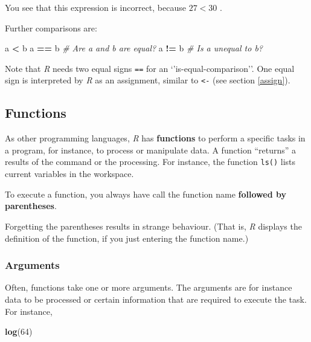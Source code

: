 \documentclass[
]{scrartcl}
\makeatletter
\newenvironment{Shaded}{\begin{snugshade}}{\end{snugshade}}
\newcommand{\CommentTok}[1]{\textcolor[rgb]{0.56,0.35,0.01}{\textit{#1}}}
\newcommand{\DecValTok}[1]{\textcolor[rgb]{0.00,0.00,0.81}{#1}}
\newcommand{\KeywordTok}[1]{\textcolor[rgb]{0.13,0.29,0.53}{\textbf{#1}}}
\newcommand{\NormalTok}[1]{#1}
\newcommand{\OperatorTok}[1]{\textcolor[rgb]{0.81,0.36,0.00}{\textbf{#1}}}
\newcommand{\StringTok}[1]{\textcolor[rgb]{0.31,0.60,0.02}{#1}}
\newenvironment{kframe}{%
\medskip{}
\setlength{\fboxsep}{.8em}
 \def\at@end@of@kframe{}%
 \ifinner\ifhmode%
  \def\at@end@of@kframe{\end{minipage}}%
  \begin{minipage}{\columnwidth}%
 \fi\fi%
 \def\FrameCommand##1{\hskip\@totalleftmargin \hskip-\fboxsep
 \colorbox{shadecolor}{##1}\hskip-\fboxsep
     \hskip-\linewidth \hskip-\@totalleftmargin \hskip\columnwidth}%
 \MakeFramed {\advance\hsize-\width
   \@totalleftmargin\z@ \linewidth\hsize
   \@setminipage}}%
 {\par\unskip\endMakeFramed%
 \at@end@of@kframe}
\newenvironment{rmdblock}[1]
  {
  \begin{itemize}
  \renewcommand{\labelitemi}{
    \raisebox{-.7\height}[0pt][0pt]{
      {\setkeys{Gin}{width=3em,keepaspectratio}\texttt{[image: images/\#1]}}
    }
  }
  \setlength{\fboxsep}{1em}
  \begin{kframe}
  \item
  }
  {
  \end{kframe}
  \end{itemize}
  }
\newenvironment{important}
    {\begin{rmdblock}{hint}}
    {\end{rmdblock}}
\makeatother
\begin{document}
You see that this expression is incorrect, because \(27<30\) .

Further comparisons are:

\begin{Shaded}
\begin{Highlighting}[]
\NormalTok{a }\OperatorTok{\textless{}}\StringTok{ }\NormalTok{b}
\NormalTok{a }\OperatorTok{==}\StringTok{ }\NormalTok{b   }\CommentTok{\# Are a and b are equal?}
\NormalTok{a }\OperatorTok{!=}\StringTok{ }\NormalTok{b   }\CommentTok{\# Is a unequal to b?}
\end{Highlighting}
\end{Shaded}

Note that \emph{R} needs two equal signs \texttt{==} for an `'is-equal-comparison''. One equal sign is interpreted by \emph{R} as an assignment, similar to \texttt{\textless{}-} (see section \ref{assign}).

\hypertarget{functions}{%
\subsection{Functions}\label{functions}}

As other programming languages, \emph{R} has \textbf{functions} to perform a specific tasks in a program, for instance, to process or manipulate data. A function ``returns'' a results of the command or the processing. For instance, the function \texttt{ls()} lists current variables in the workspace.

\begin{important}
To execute a function, you always have call the function name
\textbf{followed by parentheses}.

Forgetting the parentheses results in strange behaviour. (That is,
\emph{R} displays the definition of the function, if you just entering
the function name.)
\end{important}

\hypertarget{arguments}{%
\subsubsection{Arguments}\label{arguments}}

Often, functions take one or more arguments. The arguments are for instance data to be processed or certain information that are required to execute the task. For instance,

\begin{Shaded}
\begin{Highlighting}[]
\KeywordTok{log}\NormalTok{(}\DecValTok{64}\NormalTok{)}
\end{Highlighting}
\end{Shaded}
\end{document}
